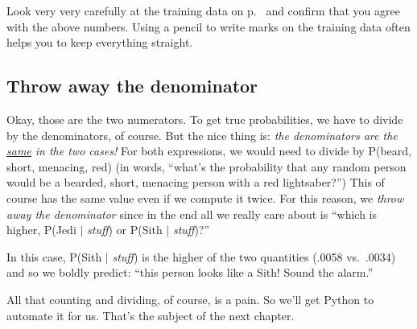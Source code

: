 \bigskip
Look very very carefully at the training data on p.~\pageref{jediTraining} and
confirm that you agree with the above numbers. Using a pencil to write marks
on the training data often helps you to keep everything straight.

\subsection{Throw away the denominator}


Okay, those are the two numerators. To get true probabilities, we have to
divide by the denominators, of course. But the nice thing is: \textit{the
denominators are the \underline{same} in the two cases!} For both expressions,
we would need to divide by P(\textrm{beard}, \textrm{short}, \textrm{menacing},
\textrm{red}) (in words, ``what's the probability that any random person would
be a bearded, short, menacing person with a red lightsaber?'') This of course
has the same value even if we compute it twice. For this reason, we
\textit{throw away the denominator} since in the end all we really care about
is ``which is higher, P(Jedi $|$ \textsl{stuff}) or P(Sith $|$
\textsl{stuff})?''

In this case, P(Sith $|$ \textsl{stuff}) is the higher of the two quantities
(.0058 vs.~.0034) and so we boldly predict: ``this person looks like a Sith!
Sound the alarm.''

\bigskip
All that counting and dividing, of course, is a pain. So we'll get Python to
automate it for us. That's the subject of the next chapter.